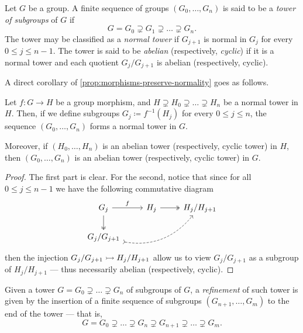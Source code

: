 
\begin{definition}
\label{def:tower-subgroups}
Let \(G\) be a group. A finite sequence of groups \((G_0, \dots, G_n)\) is said
to be a \emph{tower of subgroups} of \(G\) if
\[
  G = G_0 \supsetneq G_1 \supsetneq \dots \supsetneq G_n.
\]
The tower may be classified as a \emph{normal tower} if \(G_{j + 1}\) is normal
in \(G_j\) for every \(0 \leq j \leq n - 1\). The tower is said to be
\emph{abelian} (respectively, \emph{cyclic}) if it is a normal tower and each
quotient \(G_j/G_{j+1}\) is abelian (respectively, cyclic).
\end{definition}

A direct corollary of \cref{prop:morphisms-preserve-normality} goes as follows.

\begin{corollary}
\label{cor:morphism-normal-towers}
Let \(f: G \to H\) be a group morphism, and \(H \supsetneq H_0 \supsetneq \dots
\supsetneq H_n\) be a normal tower in \(H\). Then, if we define subgroups \(G_j
\coloneq f^{-1}(H_j)\) for every \(0 \leq j \leq n\), the sequence \((G_0,
\dots, G_n)\) forms a normal tower in \(G\).

Moreover, if \((H_0, \dots, H_n)\) is an abelian tower (respectively, cyclic
tower) in \(H\), then \((G_0, \dots, G_n)\) is an abelian tower (respectively,
cyclic tower) in \(G\).
\end{corollary}

\begin{proof}
The first part is clear. For the second, notice that since for all \(0 \leq j
\leq n-1\) we have the following commutative diagram
\[
  \begin{tikzcd}
    G_j \ar[d, two heads] \ar[r, "f"] &H_j \ar[r, two heads] & H_j/H_{j+1} \\
    G_j/G_{j+1} \ar[rru, bend right, tail, dashed]
  \end{tikzcd}
\]
then the injection \(G_j/G_{j+1} \rightarrowtail H_j/H_{j+1}\) allow us to view
\(G_j/G_{j+1}\) as a subgroup of \(H_j/H_{j+1}\) --- thus necessarily abelian
(respectively, cyclic).
\end{proof}

\begin{definition}[Refinement]
\label{def:refinement-tower}
Given a tower \(G = G_0 \supsetneq \dots \supsetneq G_n\) of subgroups of \(G\),
a \emph{refinement} of such tower is given by the insertion of a finite
sequence of subgroups \((G_{n+1}, \dots, G_m)\) to the end of the tower --- that
is,
\[
  G = G_{0} \supsetneq \dots \supsetneq G_n \supsetneq G_{n+1} \supsetneq \dots
  \supsetneq G_{m}.
\]
\end{definition}


